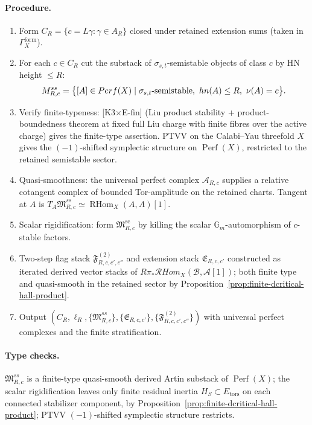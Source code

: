 \paragraph{Procedure.}
\begin{enumerate}
\item Form \(C_R=\{c=L\gamma:\gamma\in A_R\}\) closed under retained
extension sums (taken in \(\Gamma_X^{\mathrm{form}}\)).

\item For each \(c\in C_R\) cut the substack of
\(\sigma_{s,t}\)-semistable objects of class \(c\) by HN height \(\le
R\):
\[
M^{ss}_{R,c}=
\bigl\{[A]\in Perf(X)\mid
\sigma_{s,t}\hbox{-semistable},\
hn(A)\le R,\
\nu(A)=c\bigr\}.
\]

\item Verify finite-typeness: \textup{[K3$\times$E-fin]} (Liu product
stability + product-boundedness theorem at fixed full Liu charge with
finite fibres over the active charge) gives the finite-type assertion.
PTVV \cite{PTVV2013} on the Calabi--Yau threefold \(X\) gives the
\((-1)\)-shifted symplectic structure on
\(\operatorname{Perf}(X)\), restricted to the retained semistable
sector.

\item Quasi-smoothness: the universal perfect complex
\(\mathcal A_{R,c}\) supplies a relative cotangent complex of bounded
Tor-amplitude on the retained charts.  Tangent at \(A\) is
\(T_A\mathfrak M^{ss}_{R,c}\simeq\operatorname{RHom}_X(A,A)[1]\).

\item Scalar rigidification: form \(\mathfrak M^{\mathrm{sc}}_{R,c}\) by
killing the scalar \(\mathbb G_m\)-automorphism of
\(c\)-stable factors.

\item Two-step flag stack
\(\mathfrak F^{(2)}_{R,c,c',c''}\) and extension stack
\(\mathfrak E_{R,c,c'}\) constructed as iterated derived vector stacks
of \(R\pi_*\mathcal RHom_X(\mathcal B,\mathcal A[1])\); both finite type
and quasi-smooth in the retained sector by
Proposition~\ref{prop:finite-dcritical-hall-product}.

\item Output \((C_R,\ell_R,\{\mathfrak M^{ss}_{R,c}\},
\{\mathfrak E_{R,c,c'}\},\{\mathfrak F^{(2)}_{R,c,c',c''}\})\) with
universal perfect complexes and the finite stratification.
\end{enumerate}

\paragraph{Type checks.}
\(\mathfrak M^{ss}_{R,c}\) is a finite-type quasi-smooth derived Artin
substack of \(\operatorname{Perf}(X)\); the scalar rigidification leaves
only finite residual inertia
\(H_S\subset E_{\mathrm{tors}}\) on each connected stabilizer
component, by
Proposition~\ref{prop:finite-dcritical-hall-product};
PTVV \((-1)\)-shifted symplectic structure restricts.


